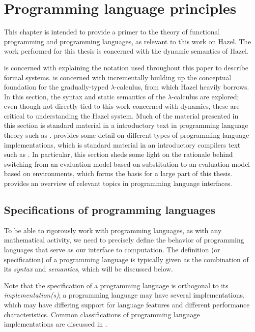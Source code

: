 \chapter{Programming language principles}
\label{sec:prog_lang_principles}

This chapter is intended to provide a primer to the theory of functional programming and programming languages, as relevant to this work on Hazel. The work performed for this thesis is concerned with the dynamic semantics of Hazel.

 is concerned with explaining the notation used throughout this paper to describe formal systems.  is concerned with incrementally building up the conceptual foundation for the gradually-typed $\lambda$-calculus, from which Hazel heavily borrows. In this section, the syntax and static semantics of the $\lambda$-calculus are explored; even though not directly tied to this work concerned with dynamics, these are critical to understanding the Hazel system. Much of the material presented in this section is standard material in a introductory text in programming language theory such as \cite{harper2016practical}.  provides some detail on different types of programming language implementations, which is standard material in an introductory compilers text such as \cite{aho86}. In particular, this section sheds some light on the rationale behind switching from an evaluation model based on substitution to an evaluation model based on environments, which forms the basis for a large part of this thesis.  provides an overview of relevant topics in programming language interfaces.

\section{Specifications of programming languages}
\label{sec:prog-lang-def}

To be able to rigorously work with programming languages, as with any mathematical activity, we need to precisely define the behavior of programming languages that serve as our interface to computation. The definition (or specification) of a programming language is typically given as the combination of its \textit{syntax} and \textit{semantics}, which will be discussed below.

Note that the specification of a programming language is orthogonal to its \textit{implementation(s)}; a programming language may have several implementations, which may have differing support for language features and different performance characteristics. Common classifications of programming language implementations are discussed in .

